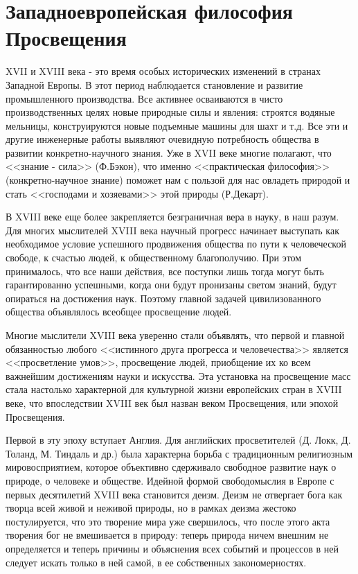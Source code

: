 \documentclass[12pt,a4paper]{article}
\begin{document}
	\section{Западноевропейская философия Просвещения~\checkmark}
	
	XVII и XVIII века - это время особых исторических изменений в странах Западной Европы. В этот период наблюдается становление и развитие промышленного производства. Все активнее осваиваются в чисто производственных целях новые природные силы и явления: строятся водяные мельницы, конструируются новые подъемные машины для шахт и т.д. Все эти и другие инженерные работы выявляют очевидную потребность общества в развитии конкретно-научного знания. Уже в XVII веке многие полагают, что <<знание - сила>> (Ф.Бэкон), что именно <<практическая философия>> (конкретно-научное знание) поможет нам с пользой для нас овладеть природой и стать <<господами и хозяевами>> этой природы (Р.Декарт).
	
	В XVIII веке еще более закрепляется безграничная вера в науку, в наш разум. Для многих мыслителей XVIII века научный прогресс начинает выступать как необходимое условие успешного продвижения общества по пути к человеческой свободе, к счастью людей, к общественному благополучию. При этом принималось, что все наши действия, все поступки лишь тогда могут быть гарантированно успешными, когда они будут пронизаны светом знаний, будут опираться на достижения наук. Поэтому главной задачей цивилизованного общества объявлялось всеобщее просвещение людей.
	
	Многие мыслители XVIII века уверенно стали объявлять, что первой и главной обязанностью любого <<истинного друга прогресса и человечества>> является <<просветление умов>>, просвещение людей, приобщение их ко всем важнейшим достижениям науки и искусства. Эта установка на просвещение масс стала настолько характерной для культурной жизни европейских стран в XVIII веке, что впоследствии XVIII век был назван веком Просвещения, или эпохой Просвещения.
	
	Первой в эту эпоху вступает Англия. Для английских просветителей (Д. Локк, Д. Толанд, М. Тиндаль и др.) была характерна борьба с традиционным религиозным мировосприятием, которое объективно сдерживало свободное развитие наук о природе, о человеке и обществе. Идейной формой свободомыслия в Европе с первых десятилетий XVIII века становится деизм. Деизм не отвергает бога как творца всей живой и неживой природы, но в рамках деизма жестоко постулируется, что это творение мира уже свершилось, что после этого акта творения бог не вмешивается в природу: теперь природа ничем внешним не определяется и теперь причины и объяснения всех событий и процессов в ней следует искать только в ней самой, в ее собственных закономерностях.
	
\end{document}
